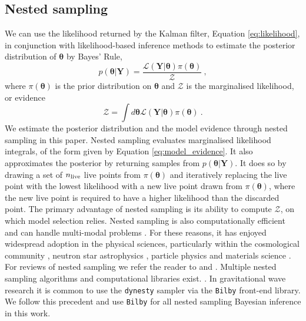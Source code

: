 \documentclass[fleqn,usenatbib,useAMS]{mnras}
\begin{document}
\subsection{Nested sampling}\label{sec:nested_sampling}
We can use the likelihood returned by the Kalman filter, Equation \eqref{eq:likelihood}, in conjunction with likelihood-based inference methods to estimate the posterior distribution of $\boldsymbol{\theta}$ by Bayes' Rule,
\begin{equation}
	p(\boldsymbol{\theta} | \boldsymbol{Y}) = \frac{\mathcal{L}(\boldsymbol{Y} | \boldsymbol{\theta}) \pi(\boldsymbol{\theta})}{\mathcal{Z}} \ ,
\end{equation}
where $\pi(\boldsymbol{\theta})$ is the prior distribution on $\boldsymbol{\theta}$ and $\mathcal{Z}$ is the marginalised likelihood, or evidence
\begin{equation}
	\mathcal{Z} = \int d \boldsymbol{\theta} \mathcal{L}(\boldsymbol{Y} | \boldsymbol{\theta})  \pi(\boldsymbol{\theta})  \ . \label{eq:model_evidence}
\end{equation}
 We estimate the posterior distribution and the model evidence through nested sampling \citep{Skilling} in this paper. Nested sampling evaluates marginalised likelihood integrals, of the form given by Equation \eqref{eq:model_evidence}. It also approximates the posterior by returning samples from $p(\boldsymbol{\theta} | \boldsymbol{Y})$. It does so by drawing a set of $n_{\rm live}$ live points from $\pi(\boldsymbol{\theta})$ and iteratively replacing the live point with the lowest likelihood with a new live point drawn from $\pi(\boldsymbol{\theta})$, where the new live point is required to have a higher likelihood than the discarded point. The primary advantage of nested sampling is its ability to compute $\mathcal{Z}$, on which model selection relies. Nested sampling is also computationally efficient and can handle multi-modal problems \citep{Ashton2022}. For these reasons, it has enjoyed widespread adoption in the physical sciences, particularly within the cosmological community \citep{Mukherjee2006,Feroz2008,Handley2015}, neutron star astrophysics \citep{Myers2021MNRAS.502.3113M,Meyers2021,Melatos2023}, particle physics \citep{proceedings2019033014} and materials science \citep{2009arXiv0906materials}. For reviews of nested sampling we refer the reader to \cite{Buchner2021} and \cite{Ashton2022}. Multiple nested sampling algorithms and computational libraries exist. \citep[e.g.][]{Feroz2008,Feroz2009,Handley2015,dynesty2020,UltraNest2021}. In gravitational wave research it is common to use the \texttt{dynesty} sampler \citep{dynesty2020} via the \texttt{Bilby} \citep{bilby.507.2037A} front-end library. We follow this precedent and use \texttt{Bilby} for all nested sampling Bayesian inference in this work. \newline 
 
\end{document}
